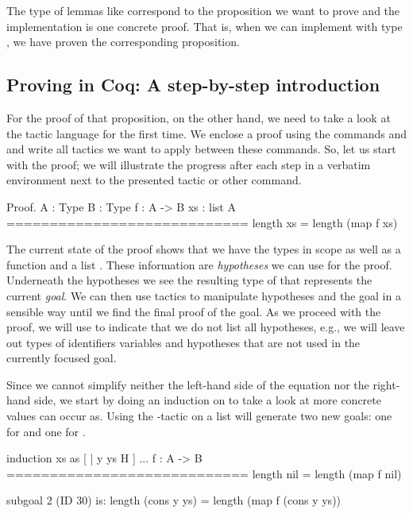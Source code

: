 The type of lemmas like  correspond to the proposition we want to prove and the implementation is one concrete proof.
That is, when we can implement  with type , we have proven the corresponding proposition.

\subsection{Proving in Coq: A step-by-step introduction}
For the proof of that proposition, on the other hand, we need to take a look at the tactic language  for the first time.
We enclose a proof using the commands  and  and write all tactics we want to apply between these commands.
So, let us start with the proof; we will illustrate the progress after each step in a verbatim environment next to the presented tactic or other command.

\begin{cproof}{Proof.}
  A : Type
  B : Type
  f : A -> B
  xs : list A
  ============================
  length xs = length (map f xs)
\end{cproof}

The current state of the proof shows that we have the types  in scope as well as a function  and a list .
These information are \emph{hypotheses} we can use for the proof.
Underneath the hypotheses we see the resulting type of  that represents the current \emph{goal}.
We can then use tactics to manipulate hypotheses and the goal in a sensible way until we find the final proof of the goal.
 As we proceed with the proof, we will use  to indicate that we do not list all hypotheses, e.g., we will leave out types of identifiers variables and hypotheses that are not used in the currently focused goal.

Since we cannot simplify neither the left-hand side of the equation nor the right-hand side, we start by doing an induction on  to take a look at more concrete values  can occur as.
Using the -tactic on a list will generate two new goals: one for  and one for .

\begin{cproof}{induction xs as [ | y ys H ]}
  ...
  f : A -> B
  ============================
  length nil = length (map f nil)

subgoal 2 (ID 30) is:
  length (cons y ys) =
  length (map f (cons y ys))
\end{cproof}

